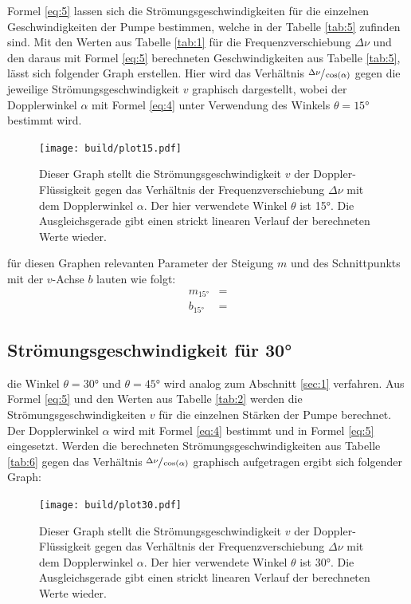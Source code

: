     \justifying Formel \eqref{eq:5} lassen sich die Strömungsgeschwindigkeiten für die einzelnen Geschwindigkeiten der Pumpe bestimmen, welche in der Tabelle \ref{tab:5}
    zufinden sind. Mit den Werten aus Tabelle \ref{tab:1} für die Frequenzverschiebung $\Delta\nu$ und den daraus mit Formel \eqref{eq:5} berechneten Geschwindigkeiten aus Tabelle \ref{tab:5}, 
    lässt sich folgender Graph erstellen. Hier wird das Verhältnis $\sfrac{\Delta\nu}{\cos(\alpha)}$ gegen die jeweilige Strömungsgeschwindigkeit $v$ graphisch dargestellt, wobei der 
    Dopplerwinkel $\alpha$ mit Formel \eqref{eq:4} unter Verwendung des Winkels $\theta=15°$ bestimmt wird. 

\begin{figure}[H]
    \centering
    \texttt{[image: build/plot15.pdf]}
    \caption{Dieser Graph stellt die Strömungsgeschwindigkeit $v$ der Doppler-Flüssigkeit gegen das Verhältnis der Frequenzverschiebung $\Delta\nu$ mit dem Dopplerwinkel $\alpha$. 
    Der hier verwendete Winkel $\theta$ ist 15°. Die Ausgleichsgerade gibt einen strickt linearen Verlauf der berechneten Werte wieder.}
    \label{fig:5}
\end{figure}

    \justifying für diesen Graphen relevanten Parameter der Steigung $m$ und des Schnittpunkts mit der $v$-Achse $b$ lauten wie folgt:
    \begin{align}
        m_{15°} &= \text{} \label{eq:6}\\
        b_{15°} &= \text{} \label{eq:7}
    \end{align}

\newpage
\subsection{Strömungsgeschwindigkeit für 30°}

    \justifying die Winkel $\theta=30°$ und $\theta=45°$ wird analog zum Abschnitt \ref{sec:1} verfahren. Aus Formel \eqref{eq:5} und den Werten aus Tabelle \ref{tab:2}
    werden die Strömungsgeschwindigkeiten $v$ für die einzelnen Stärken der Pumpe berechnet. Der Dopplerwinkel $\alpha$ wird mit Formel \eqref{eq:4} bestimmt und in Formel \eqref{eq:5}
    eingesetzt. Werden die berechneten Strömungsgeschwindigkeiten aus Tabelle \ref{tab:6} gegen das Verhältnis $\sfrac{\Delta\nu}{\cos(\alpha)}$ graphisch aufgetragen ergibt sich folgender Graph:

\begin{figure}[H]
    \centering
    \texttt{[image: build/plot30.pdf]}
    \caption{Dieser Graph stellt die Strömungsgeschwindigkeit $v$ der Doppler-Flüssigkeit gegen das Verhältnis der Frequenzverschiebung $\Delta\nu$ mit dem Dopplerwinkel $\alpha$. 
    Der hier verwendete Winkel $\theta$ ist 30°. Die Ausgleichsgerade gibt einen strickt linearen Verlauf der berechneten Werte wieder.}
    \label{fig:6}
\end{figure}

